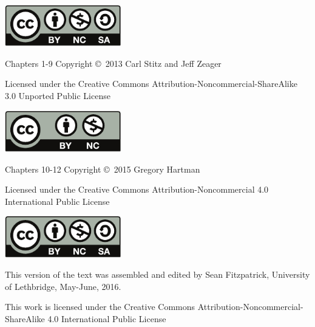 \noindent\hskip -1in\begin{minipage}{2.2in}
\begin{center}
\includegraphics[width=2in]{figures/license}
\end{center}
\end{minipage}
\begin{minipage}{3.3in}
Chapters 1-9 Copyright \copyright\ 2013 Carl Stitz and Jeff Zeager

Licensed under the Creative Commons Attribution-Noncommercial-ShareAlike 3.0 Unported Public License
\end{minipage}

\bigskip

\bigskip

\bigskip


\noindent\hskip-1in\begin{minipage}{2.2in}
\begin{center}
\includegraphics[width=2in]{text/by-nc} 
\end{center}
\end{minipage}
\begin{minipage}{3.3in}
Chapters 10-12 Copyright \copyright\ 2015 Gregory Hartman

Licensed under the Creative Commons Attribution-Noncommercial 4.0 International Public License
\end{minipage}

\bigskip

\bigskip

\bigskip

\noindent\hskip-1in\begin{minipage}{2.2in}
\begin{center}
\includegraphics[width=2in]{figures/license}
\end{center}
\end{minipage}
\begin{minipage}{3.3in}
This version of the text was assembled and edited by Sean Fitzpatrick, University of Lethbridge, May-June, 2016. 

This work is licensed under the Creative Commons Attribution-Noncommercial-ShareAlike 4.0 International Public License
\end{minipage}
